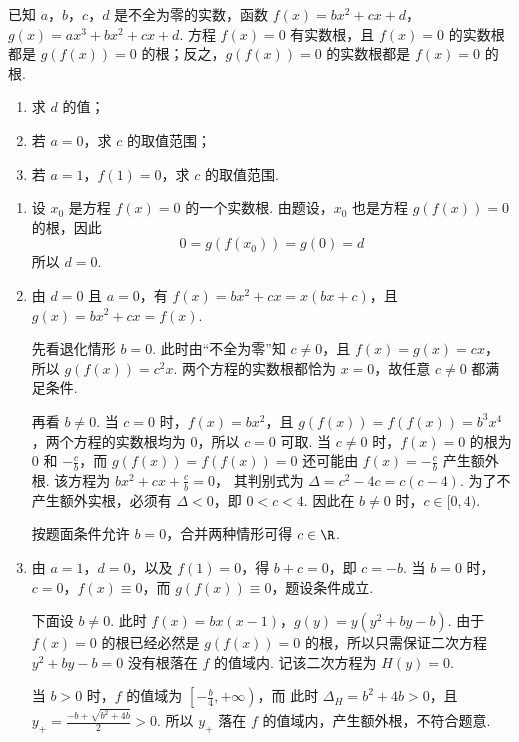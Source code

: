 \begin{problem}
已知 \(a\)，\(b\)，\(c\)，\(d\) 是不全为零的实数，函数 \(f(x) = bx^{2} + cx + d\)，\(g(x) = ax^{3} + bx^{2} + cx + d\). 方程 \(f(x) = 0\) 有实数根，且 \(f(x) = 0\) 的实数根都是 \(g(f(x)) = 0\) 的根；反之，\(g(f(x)) = 0\) 的实数根都是 \(f(x) = 0\) 的根.

\begin{enumerate}
\item 求 \(d\) 的值；
\item 若 \(a = 0\)，求 \(c\) 的取值范围；
\item 若 \(a = 1\)，\(f(1) = 0\)，求 \(c\) 的取值范围.
\end{enumerate}
\end{problem}

\begin{solution}
\begin{enumerate}
\item 设 \(x_{0}\) 是方程 \(f(x)=0\) 的一个实数根. 由题设，\(x_{0}\) 也是方程 \(g(f(x))=0\) 的根，因此
\[
0=g(f(x_{0}))=g(0)=d
\]
所以 \(d=0\).
\item 由 \(d=0\) 且 \(a=0\)，有
\(f(x)=bx^{2}+cx=x(bx+c)\)，且 \(g(x)=bx^{2}+cx=f(x)\).

先看退化情形 \(b=0\). 此时由“不全为零”知 \(c\neq0\)，且 \(f(x)=g(x)=cx\)，所以 \(g(f(x))=c^{2}x\). 两个方程的实数根都恰为 \(x=0\)，故任意 \(c\neq0\) 都满足条件.

再看 \(b\neq0\). 当 \(c=0\) 时，\(f(x)=bx^{2}\)，且 \(g(f(x))=f(f(x))=b^{3}x^{4}\)，两个方程的实数根均为 \(0\)，所以 \(c=0\) 可取. 当 \(c\neq0\) 时，\(f(x)=0\) 的根为 \(0\) 和 \(-\frac{c}{b}\)，而
\(g(f(x))=f(f(x))=0\)
还可能由 \(f(x)=-\frac{c}{b}\) 产生额外根. 该方程为
\(bx^{2}+cx+\frac{c}{b}=0\)，
其判别式为
\(\Delta=c^{2}-4c=c(c-4)\).
为了不产生额外实根，必须有 \(\Delta<0\)，即 \(0<c<4\). 因此在 \(b\neq0\) 时，\(c\in[0,4)\).

按题面条件允许 \(b=0\)，合并两种情形可得 \(c\in\R\).
\item 由 \(a=1\)，\(d=0\)，以及 \(f(1)=0\)，得 \(b+c=0\)，即 \(c=-b\). 当 \(b=0\) 时，\(c=0\)，\(f(x)\equiv0\)，而 \(g(f(x))\equiv0\)，题设条件成立.

下面设 \(b\neq0\). 此时 \(f(x)=bx(x-1)\)，\(g(y)=y\left(y^{2}+by-b\right)\).
由于 \(f(x)=0\) 的根已经必然是 \(g(f(x))=0\) 的根，所以只需保证二次方程
\(y^{2}+by-b=0\)
没有根落在 \(f\) 的值域内. 记该二次方程为 \(H(y)=0\).

当 \(b>0\) 时，\(f\) 的值域为 \(\left[-\frac{b}{4},+\infty\right)\)，而
此时 \(\Delta_H=b^{2}+4b>0\)，且 \(y_{+}=\frac{-b+\sqrt{b^{2}+4b}}{2}>0\).
所以 \(y_{+}\) 落在 \(f\) 的值域内，产生额外根，不符合题意.


\end{enumerate}
\end{solution}
